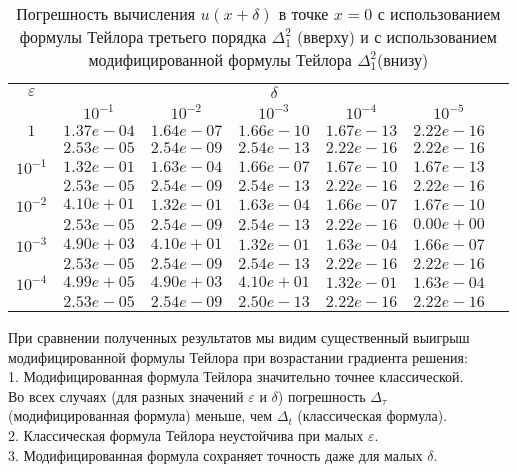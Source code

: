 \documentclass[10pt,twoside]{uz_kgu}
\begin{document}
\begin{table} [!htb]
 \caption {{Погрешность вычисления $u(x+ \delta)$ в точке $x=0$ с использованием формулы Тейлора третьего порядка $\Delta_1^2$ (вверху) и с использованием модифицированной формулы Тейлора $\Delta_1^2$(внизу)}}
	\begin{center}
		\begin{tabular}{|c|c|c|c|c|c|c}
			\cline{1-6} $\varepsilon$ & \multicolumn{5}{c|}{$\delta$} \\
			\cline{2-6} &$10^{-1}$ & $10^{-2}$ & $10^{-3}$  & $10^{-4}$& $10^{-5}$\\
			\cline{1-6}
			$1$
			&$1.37e-04$&$1.64e-07$&$1.66e-10$&$1.67e-13$& $2.22e-16$\\
			&$2.53e-05$&$2.54e-09$&$2.54e-13$&$2.22e-16$& $2.22e-16$\\
			\cline{1-6}
			$10^{-1}$
			&$1.32e-01$&$1.63e-04$&$1.66e-07$&$1.67e-10$&$1.67e-13$\\
			&$2.53e-05$&$2.54e-09$&$2.54e-13$&$2.22e-16$&$2.22e-16$\\
			\cline{1-6}
			$10^{-2}$
			&$4.10e+01$&$1.32e-01$&$1.63e-04$&$1.66e-07$&$1.67e-10$\\
			&$2.53e-05$&$2.54e-09$&$2.54e-13$&$2.22e-16$&$0.00e+00$\\
			\cline{1-6}
			$10^{-3}$
			&$4.90e+03$&$4.10e+01$&$1.32e-01$&$1.63e-04$&$1.66e-07$\\
			&$2.53e-05$&$2.54e-09$&$2.54e-13$&$2.22e-16$&$2.22e-16$\\
			\cline{1-6}
			$10^{-4}$
			&$4.99e+05$&$4.90e+03$&$4.10e+01$&$1.32e-01$&$1.63e-04$\\
			&$2.53e-05$&$2.54e-09$&$2.50e-13$&$2.22e-16$&$2.22e-16$\\
			\cline{1-6}
		\end{tabular}
	\end{center}
\end{table}

При сравнении полученных результатов мы видим существенный выигрыш модифицированной формулы Тейлора при возрастании градиента решения:\\
1. Модифицированная формула Тейлора значительно точнее классической.\\
Во всех случаях (для разных значений $\varepsilon$ и $\delta$) погрешность $\Delta_\tau$ (модифицированная формула) меньше,  чем $\Delta_t$ (классическая формула).\\
2. Классическая формула Тейлора неустойчива при малых $\varepsilon.$\\
3. Модифицированная формула сохраняет точность даже для малых $\delta$.\\
\end{document}
